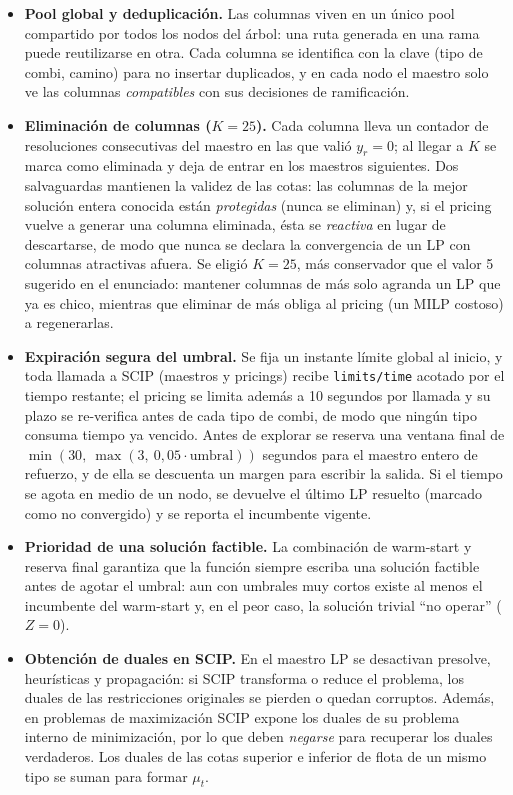 \documentclass[12pt]{article}
\numberwithin{algorithm}{section}
\begin{document}
\begin{itemize}
    \item \textbf{Pool global y deduplicación.} Las columnas viven en un único pool compartido por todos los nodos del árbol: una ruta generada en una rama puede reutilizarse en otra. Cada columna se identifica con la clave (tipo de combi, camino) para no insertar duplicados, y en cada nodo el maestro solo ve las columnas \emph{compatibles} con sus decisiones de ramificación.
    \item \textbf{Eliminación de columnas ($K = 25$).} Cada columna lleva un contador de resoluciones consecutivas del maestro en las que valió $y_r = 0$; al llegar a $K$ se marca como eliminada y deja de entrar en los maestros siguientes. Dos salvaguardas mantienen la validez de las cotas: las columnas de la mejor solución entera conocida están \emph{protegidas} (nunca se eliminan) y, si el pricing vuelve a generar una columna eliminada, ésta se \emph{reactiva} en lugar de descartarse, de modo que nunca se declara la convergencia de un LP con columnas atractivas afuera. Se eligió $K = 25$, más conservador que el valor 5 sugerido en el enunciado: mantener columnas de más solo agranda un LP que ya es chico, mientras que eliminar de más obliga al pricing (un MILP costoso) a regenerarlas.
    \item \textbf{Expiración segura del umbral.} Se fija un instante límite global al inicio, y toda llamada a SCIP (maestros y pricings) recibe \texttt{limits/time} acotado por el tiempo restante; el pricing se limita además a 10 segundos por llamada y su plazo se re-verifica antes de cada tipo de combi, de modo que ningún tipo consuma tiempo ya vencido. Antes de explorar se reserva una ventana final de $\min(30,\ \max(3,\ 0{,}05 \cdot \text{umbral}))$ segundos para el maestro entero de refuerzo, y de ella se descuenta un margen para escribir la salida. Si el tiempo se agota en medio de un nodo, se devuelve el último LP resuelto (marcado como no convergido) y se reporta el incumbente vigente.
    \item \textbf{Prioridad de una solución factible.} La combinación de warm-start y reserva final garantiza que la función siempre escriba una solución factible antes de agotar el umbral: aun con umbrales muy cortos existe al menos el incumbente del warm-start y, en el peor caso, la solución trivial ``no operar'' ($Z = 0$).
    \item \textbf{Obtención de duales en SCIP.} En el maestro LP se desactivan presolve, heurísticas y propagación: si SCIP transforma o reduce el problema, los duales de las restricciones originales se pierden o quedan corruptos. Además, en problemas de maximización SCIP expone los duales de su problema interno de minimización, por lo que deben \emph{negarse} para recuperar los duales verdaderos. Los duales de las cotas superior e inferior de flota de un mismo tipo se suman para formar $\mu_t$.

\end{itemize}
\end{document}
